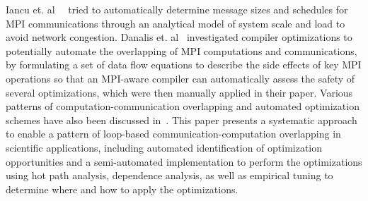 Iancu  et. al~~\cite{iancu:ppopp07}
tried to automatically determine message sizes and schedules for MPI communications through an analytical model of system scale and load  to avoid network congestion.
Danalis et. al~\cite{danalis:ics09} investigated compiler optimizations to potentially automate the overlapping of MPI computations and communications, by
formulating a set of data flow equations to describe the side effects of key MPI operations so that an MPI-aware compiler can automatically assess the safety of several optimizations, which were then manually applied in their paper.
Various patterns of computation-communication overlapping and automated optimization schemes have also been discussed in~\cite{danalis:sc05,fishgold:ipdps06}.
This paper presents a systematic approach to enable a pattern of loop-based communication-computation overlapping in scientific applications,
including automated identification of optimization opportunities and a semi-automated implementation to perform the optimizations
using hot path analysis, dependence analysis, as well as empirical tuning to determine where and how to apply the optimizations.



